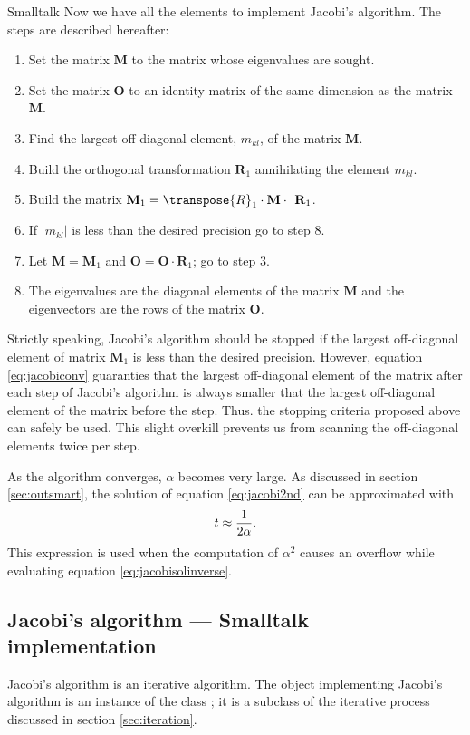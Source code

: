 \begin{displaycode}{Smalltalk}
 Now we have all the elements to
implement Jacobi's algorithm. The steps are described hereafter:
\begin{enumerate}
  \item Set the matrix $\textbf{M}$ to the matrix whose eigenvalues
  are sought.
  \item Set the matrix $\textbf{O}$ to an identity matrix of the same
  dimension as the matrix $\textbf{M}$.
  \item Find the largest off-diagonal element, $m_{kl}$, of the matrix $\textbf{
  M}$.
  \item Build the orthogonal transformation $\textbf{R}_1$
  annihilating the element $m_{kl}$.
  \item Build the matrix $\textbf{M}_1=\transpose{R}_1\cdot\textbf{M}\cdot\textbf{
  R}_1$.
  \item If $\left|m_{kl}\right|$ is less than the desired
  precision go to step 8.
  \item Let $\textbf{M}=\textbf{M}_1$ and $\textbf{O}=\textbf{O}\cdot\textbf{R}_1$; go to step 3.
  \item The eigenvalues are the diagonal elements of the matrix $\textbf{
  M}$ and the eigenvectors are the rows of the matrix $\textbf{O}$.
\end{enumerate}
Strictly speaking, Jacobi's algorithm should be stopped if the
largest off-diagonal element of matrix $\textbf{M}_1$ is less than
the desired precision. However, equation \ref{eq:jacobiconv}
guaranties that the largest off-diagonal element of the matrix
after each step of Jacobi's algorithm is always smaller that the
largest off-diagonal element of the matrix before the step. Thus.
the stopping criteria proposed above can safely be used. This
slight overkill prevents us from scanning the off-diagonal
elements twice per step.

As the algorithm converges, $\alpha$ becomes very large. As
discussed in section \ref{sec:outsmart}, the solution of equation
\ref{eq:jacobi2nd} can be approximated with
\begin{equation}
  t\approx{\displaystyle 1\over\displaystyle 2\alpha}.
\end{equation}
This expression is used when the computation of $\alpha^2$ causes
an overflow while evaluating equation \ref{eq:jacobisolinverse}.

\subsection{Jacobi's algorithm --- Smalltalk implementation}
Jacobi's algorithm is an iterative algorithm.
The object implementing Jacobi's algorithm is an instance of the class ; it is a subclass of the iterative process discussed in section \ref{sec:iteration}.


\end{displaycode}
